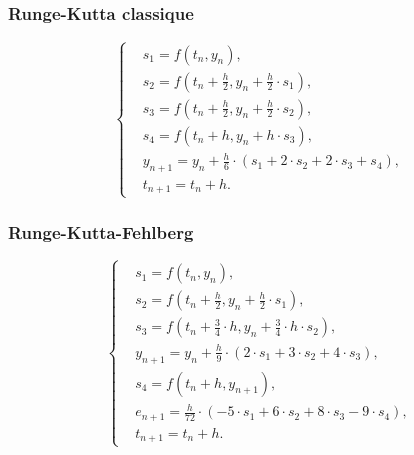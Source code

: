 \subsubsection*{Runge-Kutta classique}
\noindent
\begin{equation}
    \left\{
    \begin{aligned}
         & s_1     = f(t_n,y_n),                                             \\
         & s_2     = f\left(t_n+\frac{h}{2},y_n+\frac{h}{2}\cdot s_1\right), \\
         & s_3     = f\left(t_n+\frac{h}{2},y_n+\frac{h}{2}\cdot s_2\right), \\
         & s_4     = f(t_n+h,y_n+h\cdot s_3),                                \\
         & y_{n+1} = y_n+\frac{h}{6}\cdot(s_1+2\cdot s_2+2\cdot s_3+s_4),    \\
         & t_{n+1} = t_n+h.
    \end{aligned}
    \right.
    \nonumber
\end{equation}
\subsubsection*{Runge-Kutta-Fehlberg}
\noindent
\begin{equation}
    \left\{
    \begin{aligned}
         & s_1     = f(t_n,y_n),                                                           \\
         & s_2     = f\left(t_n+\frac{h}{2},y_n+\frac{h}{2}\cdot s_1\right),               \\
         & s_3     = f\left(t_n+\frac{3}{4}\cdot h,y_n+\frac{3}{4}\cdot h\cdot s_2\right), \\
         & y_{n+1} = y_n+\frac{h}{9}\cdot(2\cdot s_1+3\cdot s_2+4\cdot s_3),               \\
         & s_4     = f(t_n+h,y_{n+1}),                                                     \\
         & e_{n+1} = \frac{h}{72}\cdot(-5\cdot s_1+6\cdot s_2+8\cdot s_3-9\cdot s_4),      \\
         & t_{n+1} = t_n+h.
    \end{aligned}
    \right.
    \nonumber
\end{equation}
